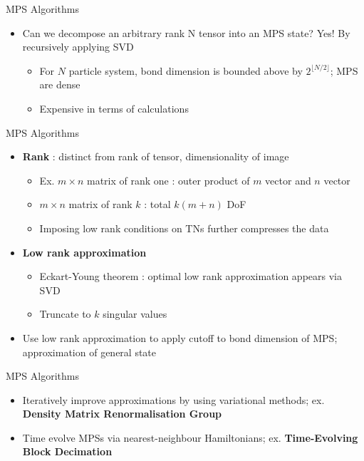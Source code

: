 \documentclass{beamer}
\begin{document}
\begin{frame}{MPS Algorithms}
	\begin{itemize}
	\item Can we decompose an arbitrary rank N tensor into an MPS state? Yes! By recursively applying SVD
		\begin{itemize}
		\item For ${ N }$ particle system, bond dimension is bounded above by ${ 2^{\lfloor N/2\rfloor}}$; MPS are dense
		\item Expensive in terms of calculations
		\end{itemize}
	\end{itemize}
\end{frame}

\begin{frame}{MPS Algorithms}
	\begin{itemize}
				\item \textbf{Rank} : distinct from rank of tensor, dimensionality of image
					\begin{itemize}
			\item Ex. ${ m \times n }$ matrix of rank one : outer product of ${ m }$ vector and ${ n }$ vector
			\item ${ m \times  n }$ matrix of rank ${ k }$ : total ${ k(m+n) }$ DoF
			\item Imposing low rank conditions on TNs further compresses the data
				\end{itemize}
		\item \textbf{Low rank approximation}
			\begin{itemize}
				\item Eckart-Young theorem : optimal low rank approximation appears via SVD
				\item Truncate to ${ k }$ singular values
			\end{itemize}
		\item Use low rank approximation to apply cutoff to bond dimension of MPS; approximation of general state
	\end{itemize}
	
\end{frame}


\begin{frame}{MPS Algorithms}
	\begin{itemize}
	\item Iteratively improve approximations by using variational methods; ex. \textbf{Density Matrix Renormalisation Group}
	\item Time evolve MPSs via nearest-neighbour Hamiltonians; ex. \textbf{Time-Evolving Block Decimation}
	\end{itemize}
\end{frame}
\end{document}
